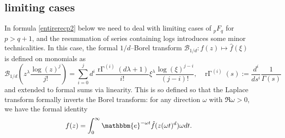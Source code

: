 \documentclass[12pt]{article}
\newcommand{\ee}[0] {\mathbbm{e}}
\numberwithin{equation}{section}
\begin{document}
\subsection{limiting cases}
In formula \eqref{entirerecp2} below we need to deal with limiting cases of ${}_p F_q$ for $p > q+1$, and the resummation of series containing logs introduces some minor technicalities. In this case, the formal $1/d$--Borel transform $\mathcal{B}_{1/d}: f(z) \mapsto \hat{f}(\xi)$ is defined on monomials as
\begin{equation*}
\mathcal{B}_{1/d} \left(z^\lambda \frac{\log(z)^j}{j!} \right) = \sum_{i=0}^{j} d^{i}\frac{{\operatorname{r\Gamma}}^{(i)}(d\lambda+1)}{i!} {\xi}^{\lambda}\frac{\log(\xi)^{j-i}}{(j-i)!}\text{,} \quad \operatorname{r\Gamma}^{(i)}(s):=\frac{d^i}{ds^i}\frac{1}{\Gamma(s)}
\end{equation*}
and extended to formal sums via linearity. This is so defined so that the Laplace transform formally inverts the Borel transform: for any direction $\omega$ with $\Re \omega > 0$, we have the formal identity
\begin{equation*}
f(z) = \int_{0}^{\infty} \ee^{-\omega t} \hat{f}(z (\omega t)^d) \omega dt\text{.}
\end{equation*}
\end{document}
